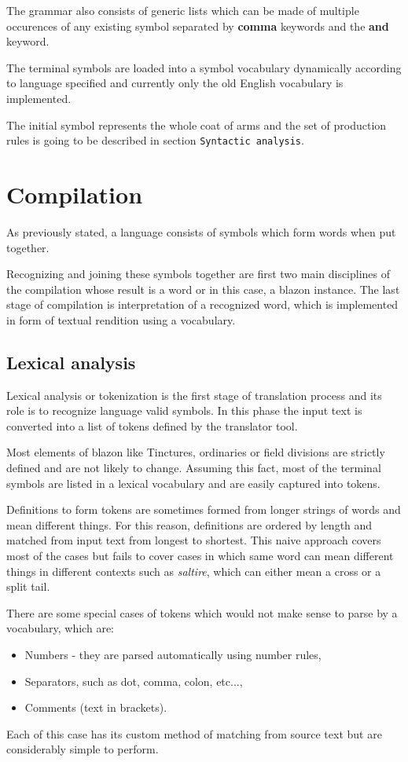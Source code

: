 \documentclass[12pt,a4paper]{article}
\let\oldsection\section
\renewcommand\section{\clearpage\oldsection}
\begin{document}
The grammar also consists of generic lists which can be made of multiple occurences of any existing symbol separated by \textbf{comma} keywords and the \textbf{and} keyword.

The terminal symbols are loaded into a symbol vocabulary dynamically according to language specified and currently only the old English vocabulary is implemented.

The initial symbol represents the whole coat of arms and the set of production rules is going to be described in section \texttt{Syntactic analysis}.


\section{Compilation}
As previously stated, a language consists of symbols which form words when put together.

Recognizing and joining these symbols together are first two main disciplines of the compilation whose result is a word or in this case, a blazon instance.
The last stage of compilation is interpretation of a recognized word, which is implemented in form of textual rendition using a vocabulary.


\subsection{Lexical analysis} 
Lexical analysis or tokenization is the first stage of translation process and its role is to recognize language valid symbols.
In this phase the input text is converted into a list of tokens defined by the translator tool.

Most elements of blazon like Tinctures, ordinaries or field divisions are strictly defined and are not likely to change.
Assuming this fact, most of the terminal symbols are listed in a lexical vocabulary and are easily captured into tokens.

Definitions to form tokens are sometimes formed from longer strings of words and mean different things. For this reason, definitions are ordered by length and matched from input text from longest to shortest.
This naive approach covers most of the cases but fails to cover cases in which same word can mean different things in different contexts such as \textit{saltire}, which can either mean a cross or a split tail.

There are some special cases of tokens which would not make sense to parse by a vocabulary, which are:
\begin{itemize}
\setlength\itemsep{-0.5em}
\item Numbers - they are parsed automatically using number rules,
\item Separators, such as dot, comma, colon, etc...,
\item Comments (text in brackets).
\end{itemize}
Each of this case has its custom method of matching from source text but are considerably simple to perform.
\end{document}
